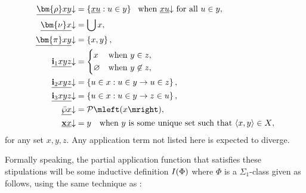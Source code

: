 \documentclass[12pt,openany]{book}
\theoremstyle{plain}
\theoremstyle{definition}
\newcommand\tuple[1]{\left\langle #1 \right\rangle}
\newcommand\Pow{\mathcal{P}}
\newcommand\bi{\mathbf{i}}
\newcommand\bx{\mathbf{x}}
\begin{document}
\begin{align*}
  \underline{\bm{\rho} xy} {\downarrow}   & = \left\{\underline{xu} : u \in y\right\} \ \ \text{when $\underline{xu} {\downarrow}$ for all $u \in y$}, \\
  \underline{\bm{\nu} x} {\downarrow}     & = \bigcup x,                                                                                               \\
  \underline{\bm{\pi} xy} {\downarrow}    & = \left\{x, y\right\},                                                                                     \\
  \underline{\bi_1 xyz} {\downarrow}      & = \left\{\begin{aligned}
                                                        & x           &  & \text{when $y \in z$},     \\
                                                        & \varnothing &  & \text{when $y \not\in z$}, \\
                                                     \end{aligned} \right.                                                    \\
  \underline{\bi_2 xyz} {\downarrow}      & = \left\{u \in x : u \in y \rightarrow u \in z\right\},                                                    \\
  \underline{\bi_3 xyz} {\downarrow}      & = \left\{u \in x : u \in y \rightarrow z \in u\right\},                                                    \\
  \underline{\bar{\wp} x} {\downarrow}    & = \Pow\mleft(x\mright),                                                                                    \\
  \underline{\bx x} {\downarrow}          & = y \quad \text{when $y$ is some unique set such that $\tuple{x, y} \in X$},
\end{align*}
for any set $x, y, z$. Any application term not listed here is expected to diverge.

Formally speaking, the partial application function that satisfies these stipulations will be some inductive definition $I\mleft(\Phi\mright)$ where $\Phi$ is a $\Sigma_1$-class given as follows, using the same technique as \cite{rathjen12-czf-powerset}:
\end{document}
